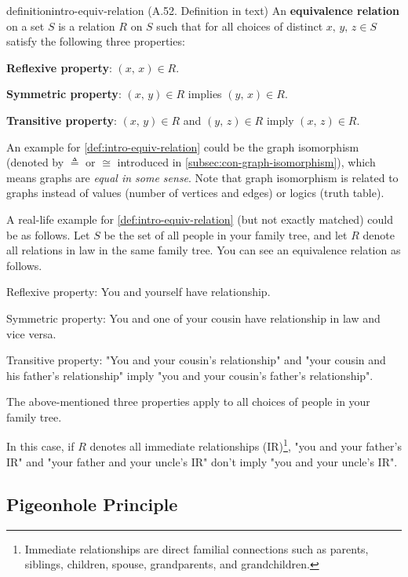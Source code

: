 \documentclass[../src/handouts/main.tex]{subfiles}
\begin{document}
\begin{recallable}{definition}{}{intro-equiv-relation}
  (A.52. Definition in text)
  An \textbf{equivalence relation} on a set $S$ is a relation $R$ on $S$ such that for all choices of distinct $x,\, y,\,z \in S$ satisfy the following three properties:
  \begin{enumerate*}
    \item \textbf{Reflexive property}: $(x,\, x) \in R$.
    \item \textbf{Symmetric property}: $(x,\, y) \in R$ implies $(y,\, x) \in R$.
    \item \textbf{Transitive property}: $(x,\, y) \in R$ and $(y,\, z) \in R$ imply $(x,\, z) \in R$.
  \end{enumerate*}
\end{recallable}

An example for \cref{def:intro-equiv-relation} could be the graph isomorphism (denoted by $\triangleq$ or $\cong$ introduced in \cref{subsec:con-graph-isomorphism}), which means graphs are \textit{equal in some sense}. Note that graph isomorphism is related to graphs instead of values (number of vertices and edges) or logics (truth table).

A real-life example for \cref{def:intro-equiv-relation} (but not exactly matched) could be as follows. Let $S$ be the set of all people in your family tree, and let $R$ denote all relations in law in the same family tree. You can see an equivalence relation as follows.
\begin{enumerate*}
  \item Reflexive property: You and yourself have relationship.
  \item Symmetric property: You and one of your cousin have relationship in law and vice versa.
  \item Transitive property: "You and your cousin's relationship" and "your cousin and his father's relationship" imply "you and your cousin's father's relationship".
  \item The above-mentioned three properties apply to all choices of people in your family tree.
\end{enumerate*}
In this case, if $R$ denotes all immediate relationships (IR)\footnote{Immediate relationships are direct familial connections such as parents, siblings, children, spouse, grandparents, and grandchildren.}, "you and your father's IR" and "your father and your uncle's IR" don't imply "you and your uncle's IR".

\subsection{Pigeonhole Principle}
\end{document}
